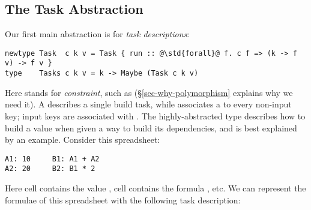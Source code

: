 \subsection{The Task Abstraction}\label{sec-task}

Our first main abstraction is for \emph{task descriptions}:
\begin{verbatim}
newtype Task  c k v = Task { run :: @\std{forall}@ f. c f => (k -> f v) -> f v }
type    Tasks c k v = k -> Maybe (Task c k v)
\end{verbatim}

\noindent
Here  stands for \emph{constraint}, such as 
(\S\ref{sec-why-polymorphism} explains why we need it).
A  describes a single build task, while  associates a
 to every non-input key; input keys are associated with .
The highly-abstracted type  describes how to build a value when given
a way to build its dependencies, and is best explained by an example.
Consider this \Excel spreadsheet:

\begin{verbatim}
A1: 10     B1: A1 + A2
A2: 20     B2: B1 * 2
\end{verbatim}

\noindent
Here cell  contains the value , cell  contains the
formula , etc. We can represent the formulae of this spreadsheet
with the following task description:


